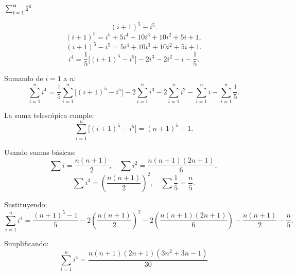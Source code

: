 $\displaystyle \mathbf{\sum_{i=1}^{n} i^4}$ 
\nopagebreak

\[
(i+1)^5 - i^5.
\]
\[
(i+1)^5 = i^5 + 5i^4 + 10i^3 + 10i^2 + 5i + 1,
\]
\[
(i+1)^5 - i^5 = 5i^4 + 10i^3 + 10i^2 + 5i + 1.
\]
\[
i^4 = \frac{1}{5}\big[(i+1)^5 - i^5\big]
      - 2i^3 - 2i^2 - i - \frac{1}{5}.
\]

Sumando de \(i=1\) a \(n\):
\[
\sum_{i=1}^{n} i^4
=
\frac{1}{5}\sum_{i=1}^{n}\big[(i+1)^5 - i^5\big]
-2\sum_{i=1}^{n} i^3
-2\sum_{i=1}^{n} i^2
-\sum_{i=1}^{n} i
-\sum_{i=1}^{n} \frac{1}{5}.
\]

La suma telescópica cumple:
\[
\sum_{i=1}^{n}\big[(i+1)^5 - i^5\big] = (n+1)^5 - 1.
\]

Usando sumas básicas:
\[
\sum i = \frac{n(n+1)}{2}, \quad
\sum i^2 = \frac{n(n+1)(2n+1)}{6},
\]
\[
\sum i^3 = \left(\frac{n(n+1)}{2}\right)^2, \quad
\sum \frac{1}{5} = \frac{n}{5}.
\]

Sustituyendo:
\[
\sum_{i=1}^{n} i^4
=
\frac{(n+1)^5 - 1}{5}
-2\left(\frac{n(n+1)}{2}\right)^2
-2\left(\frac{n(n+1)(2n+1)}{6}\right)
-\frac{n(n+1)}{2}
-\frac{n}{5}.
\]

Simplificando:
\[
\boxed{
\sum_{i=1}^{n} i^4
=
\frac{n(n+1)(2n+1)(3n^2+3n-1)}{30}
}
\]
